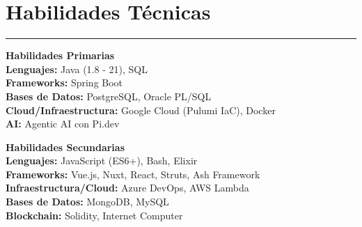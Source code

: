 \documentclass[11pt,a4paper]{article}
\begin{document}
\section*{Habilidades Técnicas}
\hrule
\vspace{5pt}
\begin{minipage}[t]{0.48\textwidth}
\textbf{Habilidades Primarias} \\[6pt]
\textbf{Lenguajes:} Java (1.8 - 21), SQL \\
\textbf{Frameworks:} Spring Boot \\
\textbf{Bases de Datos:} PostgreSQL, Oracle PL/SQL \\
\textbf{Cloud/Infraestructura:} Google Cloud (Pulumi IaC), Docker \\
\textbf{AI:} Agentic AI con Pi.dev
\end{minipage}
\hfill
\begin{minipage}[t]{0.48\textwidth}
\textbf{Habilidades Secundarias} \\[6pt]
\textbf{Lenguajes:} JavaScript (ES6+), Bash, Elixir \\
\textbf{Frameworks:} Vue.js, Nuxt, React, Struts, Ash Framework \\
\textbf{Infraestructura/Cloud:} Azure DevOps, AWS Lambda \\
\textbf{Bases de Datos:} MongoDB, MySQL \\
\textbf{Blockchain:} Solidity, Internet Computer
\end{minipage}

\vspace{8pt}

\end{document}
